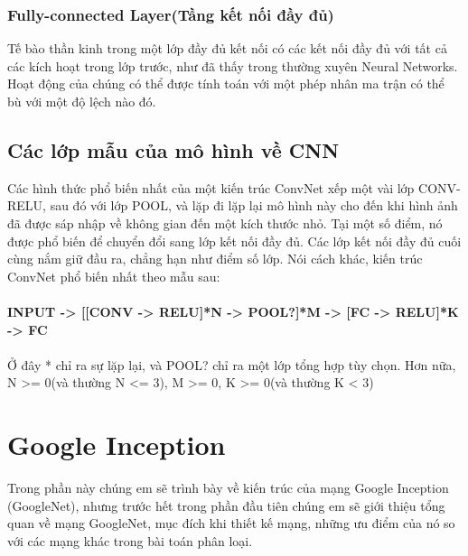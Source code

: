 \documentclass[a4paper,12pt]{report}
\begin{document}
\subsection{Fully-connected Layer(Tầng kết nối đầy đủ)}
Tế bào thần kinh trong một lớp đầy đủ kết nối có các kết nối đầy đủ với tất cả các kích hoạt trong lớp trước, như đã thấy trong thường xuyên Neural Networks. Hoạt động của chúng có thể được tính toán với một phép nhân ma trận có thể bù với một độ lệch nào đó.
\section{Các lớp mẫu của mô hình về CNN}
Các hình thức phổ biến nhất của một kiến trúc ConvNet xếp một vài lớp CONV-RELU, sau đó với lớp POOL, và lặp đi lặp lại mô hình này cho đến khi hình ảnh đã được sáp nhập về không gian đến một kích thước nhỏ. Tại một số điểm, nó được phổ biến để chuyển đổi sang lớp kết nối đầy đủ. Các lớp kết nối đầy đủ cuối cùng nắm giữ đầu ra, chẳng hạn như điểm số lớp. Nói cách khác, kiến trúc ConvNet phổ biến nhất theo mẫu sau: \\
\\
\small{
\textbf{INPUT -> [[CONV -> RELU]*N -> POOL?]*M -> [FC -> RELU]*K -> FC}
}
\\ \\
Ở đây * chỉ ra sự lặp lại, và POOL? chỉ ra một lớp tổng hợp tùy chọn. Hơn nữa, N >= 0(và thường N <= 3), M >= 0, K >= 0(và thường K < 3)


\chapter{Google Inception}
Trong phần này chúng em sẽ trình bày về kiến trúc của mạng Google Inception (GoogleNet), nhưng trước hết trong phần đầu tiên chúng em sẽ giới thiệu tổng quan về mạng GoogleNet, mục đích khi thiết kế mạng, những ưu điểm của nó so với các mạng khác trong bài toán phân loại.
\end{document}
